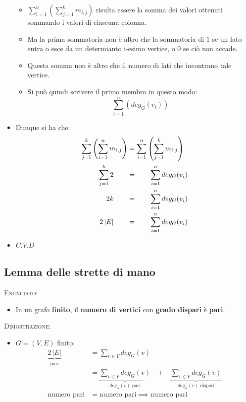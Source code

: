 \documentclass[10pt]{article}
\begin{document}
\begin{itemize}
\begin{itemize}
\item
$\displaystyle{\sum_{i = 1}^{n} \left(\sum_{j = 1}^{k} m_{i,j}\right)}$ risulta essere la somma dei valori ottenuti sommando i valori di ciascuna colonna.
\item
Ma la prima sommatoria non è altro che la sommatoria di $1$ se un lato entra o esce da un determianto i-esimo vertice, o $0$ se ciò non accade.
\item
Questa somma non è altro che il numero di lati che incontrano tale vertice.
\item
Si può quindi scrivere il primo membro in questo modo:
$$\displaystyle{\sum_{i = 1}^{n} \left(deg_G (v_i)\right)}$$
\end{itemize}
\item
Dunque si ha che:
\begin{equation}
\begin{split}
\sum_{j = 1}^{k} \left(\sum_{i = 1}^{n} m_{i,j} \right) &= \sum_{i = 1}^{n} \left(\sum_{j = 1}^{k} m_{i,j} \right) \\
\sum_{j = 1}^{k} 2 \quad \quad &= \quad \quad \sum_{i = 1}^{n} deg_G (v_i)\\
2k \quad \quad &= \quad \quad \sum_{i = 1}^{n} deg_G (v_i) \\
2\,|E| \quad \quad &= \quad \quad \sum_{i = 1}^{n} deg_G (v_i)
\notag
\end{split}
\end{equation}
\item
$C.V.D$
\end{itemize}
\subsection{Lemma delle strette di mano}
\textsc{Enunciato:}
\begin{itemize}
\item
In un grafo \textbf{finito}, il \textbf{numero di vertici} con \textbf{grado dispari} è \textbf{pari}.
\end{itemize}
\textsc{Dimostrazione:}
\begin{itemize}
\item
$G = (V,E)$ finito:
\begin{equation}
\begin{split}
\displaystyle{\underbrace{2\,|E|}_{\textrm{pari}}} &= \displaystyle{\sum_{v \in V} deg_G(v)} \\
&= \underbrace{\sum_{v \in V} deg_G(v)}_{deg_G(v) \textrm { pari}} \,\,\,\,\, + \,\,\,\,\, \underbrace{\sum_{v \in V} deg_G(v)}_{deg_G(v) \textrm { dispari}} \\
\textrm{numero pari} &= \textrm{numero pari} \implies \textrm{numero pari} 
\end{split}
\end{equation}
\end{itemize}
\end{document}
